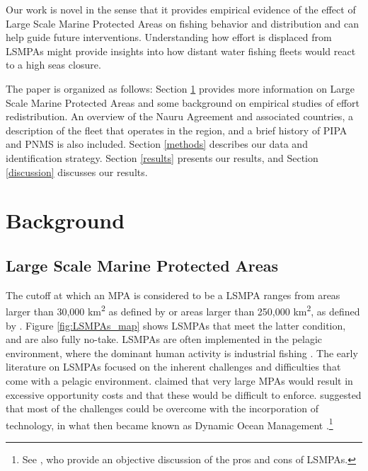 \documentclass[9pttwoside,lineno]{pnas-new}
\begin{document}
Our work is novel in the sense that it provides empirical evidence of
the effect of Large Scale Marine Protected Areas on fishing behavior and
distribution and can help guide future interventions. Understanding how
effort is displaced from LSMPAs might provide insights into how distant water fishing fleets would react to a high seas closure.

The paper is organized as follows: Section \ref{background} provides more
information on Large Scale Marine Protected Areas and some background on
empirical studies of effort redistribution. An overview of the Nauru
Agreement and associated countries, a description of the fleet that
operates in the region, and a brief history of PIPA and PNMS is also included.
Section \ref{methods} describes our data and identification strategy.
Section \ref{results} presents our results, and Section \ref{discussion}
discusses our
results.

\section{Background}\label{background}

\hypertarget{large-scale-marine-protected-areas}{%
\subsection{Large Scale Marine Protected
Areas}\label{large-scale-marine-protected-areas}}

The cutoff at which an MPA is considered to be a LSMPA ranges from areas
larger than 30,000 km\textsuperscript{2} as defined by
\citet{desanto_2013} or areas larger than 250,000 km\textsuperscript{2},
as defined by \citep{toonen_2013}. Figure \ref{fig:LSMPAs_map} shows
LSMPAs that meet the latter condition, and are also fully no-take. LSMPAs are often
implemented in the pelagic environment, where the dominant human
activity is industrial fishing \citep{gray_2017,kroodsma_2018}. The
early literature on LSMPAs focused on the inherent challenges and
difficulties that come with a pelagic environment. \citet{kaplan_2010}
claimed that very large MPAs would result in excessive opportunity costs
and that these would be difficult to enforce. \citet{game_2009}
suggested that most of the challenges could be overcome with the
incorporation of technology, in what then became known as Dynamic Ocean
Management \citep{maxwell_2015}.\footnote{See \citet{singleton_2014}, who provide an objective discussion of the pros and cons of LSMPAs.} 
\end{document}
